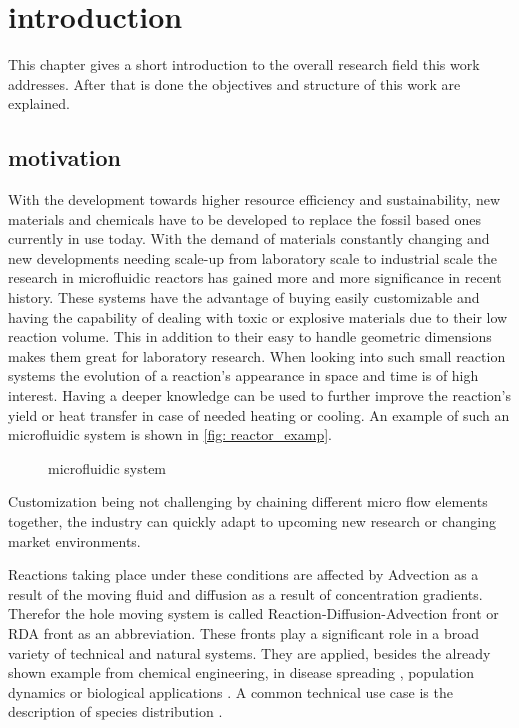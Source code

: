 \documentclass[../thesis.tex]{subfiles}
\begin{document}
\chapter{introduction}
\label{chp:introduction}

This chapter gives a short introduction to the overall research field this work addresses. After that is done the objectives and structure of this work are explained.

\section{motivation}

With the development towards higher resource efficiency and sustainability, new materials and chemicals have to be developed to replace the fossil based ones currently in use today. With the demand of materials constantly changing and new developments needing scale-up from laboratory scale to industrial scale the research in microfluidic reactors has gained more and more significance in recent history. These systems have the advantage of buying easily customizable and having the capability of dealing with toxic or explosive materials due to their low reaction volume. This in addition to their easy to handle geometric dimensions makes them great for laboratory research. When looking into such small reaction systems the evolution of a reaction's appearance in space and time is of high interest. Having a deeper knowledge can be used to further improve the reaction's yield or heat transfer in case of needed heating or cooling. An example of such an microfluidic system is shown in \autoref{fig: reactor_examp}. 
\begin{figure}[htb]
	\centering
	\qquad
	\caption{microfluidic system \cite{corning}}%
	\label{fig: reactor_examp}%
\end{figure}
Customization being not challenging by chaining different micro flow elements together, the industry can quickly adapt to upcoming new research or changing market environments.

Reactions taking place under these conditions are affected by Advection as a result of the moving fluid and diffusion as a result of concentration gradients. Therefor the hole moving system is called Reaction-Diffusion-Advection front or RDA front as an abbreviation.
These fronts play a significant role in a broad variety of technical and natural systems. They are applied, besides the already shown example from chemical engineering, in disease spreading \cite{kuto2017concentration}, population dynamics \cite{chen2018hopf, wang2019persistence} or biological applications \cite{zhao2011operator}. A common technical use case is the description of species distribution \cite{nakagaki1999reaction, von2013measurement}.
\end{document}
